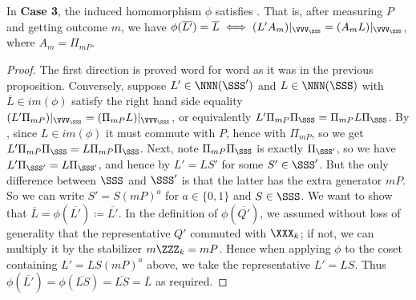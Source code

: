 \begin{proposition}
    In \textbf{Case 3}, the induced homomorphism $\phi$ satisfies .
    That is, after measuring $P$ and getting outcome $m$, we have $\phi(\overline{L'}) = \overline{L} \iff (L' A_m)|_{\VVV_\SSS} = (A_m L)|_{\VVV_\SSS}$, where $A_m = \Pi_{mP}$.
    \begin{proof}
        The first direction is proved word for word as it was in the previous proposition.
        Conversely, suppose $L' \in \NNN(\SSS')$ and $L \in \NNN(\SSS)$ with $\overline{L} \in im(\phi)$ satisfy the right hand side equality $(L' \Pi_{mP})|_{\VVV_\SSS} = (\Pi_{mP} L)|_{\VVV_\SSS}$, or equivalently $L' \Pi_{mP} \Pi_{\SSS} = \Pi_{mP} L \Pi_{\SSS}$.
        By , since $L \in im(\phi)$ it must commute with $P$, hence with $\Pi_{mP}$, so we get $L' \Pi_{mP} \Pi_{\SSS} = L \Pi_{mP} \Pi_{\SSS}$.
        Next, note $\Pi_{mP} \Pi_{\SSS}$ is exactly $\Pi_{\SSS'}$, so we have $L' \Pi_{\SSS'} = L \Pi_{\SSS'}$, and hence by  $L' = LS'$ for some $S' \in \SSS'$.
        But the only difference between $\SSS$ and $\SSS'$ is that the latter has the extra generator $mP$.
        So we can write $S' = S(mP)^a$ for $a \in \{0, 1\}$ and $S \in \SSS$.
        We want to show that $\overline{L} = \phi(\overline{L'}) \coloneqq \overline{L'}$.
        In the definition of $\phi(\overline{Q'})$, we assumed without loss of generality that the representative $Q'$ commuted with $\XXX_k$; if not, we can multiply it by the stabilizer $m\ZZZ_k = mP$.
        Hence when applying $\phi$ to the coset containing $L' = LS(mP)^a$ above, we take the representative $L' = LS$.
        Thus $\phi(\overline{L'}) = \phi(\overline{LS}) = \overline{LS} = \overline{L}$ as required.
    \end{proof}
\end{proposition}

